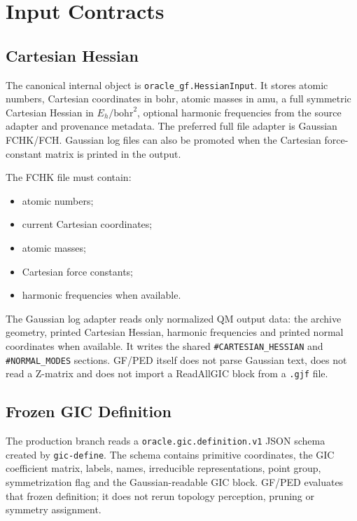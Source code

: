 \documentclass[11pt]{article}
\newcommand{\bohr}{\text{bohr}}
\begin{document}
\section{Input Contracts}

\subsection{Cartesian Hessian}

The canonical internal object is \texttt{oracle\_gf.HessianInput}.  It stores
atomic numbers, Cartesian coordinates in bohr, atomic masses in amu, a full
symmetric Cartesian Hessian in \(E_h/\bohr^2\), optional harmonic frequencies
from the source adapter and provenance metadata.  The preferred full file
adapter is Gaussian FCHK/FCH.  Gaussian log files can also be promoted when the
Cartesian force-constant matrix is printed in the output.

The FCHK file must contain:

\begin{itemize}
  \item atomic numbers;
  \item current Cartesian coordinates;
  \item atomic masses;
  \item Cartesian force constants;
  \item harmonic frequencies when available.
\end{itemize}

\noindent
The Gaussian log adapter reads only normalized QM output data: the archive
geometry, printed Cartesian Hessian, harmonic frequencies and printed normal
coordinates when available.  It writes the shared \texttt{\#CARTESIAN\_HESSIAN}
and \texttt{\#NORMAL\_MODES} sections.  GF/PED itself does not parse Gaussian
text, does not read a Z-matrix and does not import a ReadAllGIC block from a
\texttt{.gjf} file.

\subsection{Frozen GIC Definition}

The production branch reads a \texttt{oracle.gic.definition.v1} JSON schema
created by \texttt{gic-define}.  The schema contains primitive coordinates, the
GIC coefficient matrix, labels, names, irreducible representations, point group,
symmetrization flag and the Gaussian-readable GIC block.  GF/PED evaluates that
frozen definition; it does not rerun topology perception, pruning or symmetry
assignment.
\end{document}
